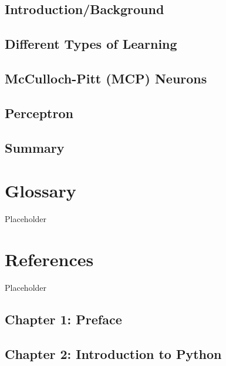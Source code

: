 \documentclass[
]{book}
\begin{document}
\hypertarget{introductionbackground}{%
\section{Introduction/Background}\label{introductionbackground}}

\hypertarget{different-types-of-learning}{%
\section{Different Types of Learning}\label{different-types-of-learning}}

\hypertarget{mcculloch-pitt-mcp-neurons}{%
\section{McCulloch-Pitt (MCP) Neurons}\label{mcculloch-pitt-mcp-neurons}}

\hypertarget{perceptron}{%
\section{Perceptron}\label{perceptron}}

\hypertarget{summary}{%
\section{Summary}\label{summary}}

\hypertarget{Ch9}{%
\chapter{Glossary}\label{Ch9}}

Placeholder

\hypertarget{Ch10}{%
\chapter{References}\label{Ch10}}

Placeholder

\hypertarget{chapter-1-preface}{%
\section{Chapter 1: Preface}\label{chapter-1-preface}}

\hypertarget{chapter-2-introduction-to-python}{%
\section{Chapter 2: Introduction to Python}\label{chapter-2-introduction-to-python}}
\end{document}
